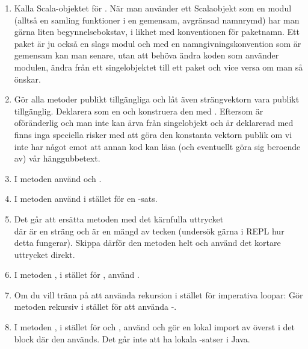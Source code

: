 \begin{enumerate}

\item Kalla Scala-objektet för . När man använder ett Scalaobjekt som en modul (alltså en samling funktioner i en gemensam, avgränsad namnrymd) har man gärna liten begynnelsebokstav, i likhet med konventionen för paketnamn. Ett paket är ju också en slags modul och med en namngivningskonvention som är gemensam kan man senare, utan att behöva ändra koden som använder modulen, ändra från ett singelobjektet till ett paket och vice versa om man så önskar.

\item Gör alla metoder publikt tillgängliga och låt även strängvektorn  vara publikt tillgänglig. Deklarera  som en  och konstruera den med . Eftersom  är oföränderlig och man inte kan ärva från singelobjekt och  är deklarerad med  finns inga speciella risker med att göra den konstanta vektorn publik om  vi inte har något emot att annan kod kan läsa (och eventuellt göra sig beroende av) vår hänggubbetext.

\item I metoden  använd  och .

\item I metoden  använd  i stället för en -sats.

\item Det går att ersätta metoden  med det kärnfulla uttrycket \\  där  är en sträng och  är en mängd av tecken (undersök gärna i REPL hur detta fungerar). Skippa därför den metoden helt och använd det kortare uttrycket direkt.

\item I metoden , i stället för , använd . 

\item Om du vill träna på att använda rekursion i stället för imperativa loopar: Gör metoden  rekursiv i stället för att använda -.

\item I metoden , i stället för  och , använd  och gör en lokal import av  överst i det block där den används. Det går inte att ha lokala -satser i Java.


\end{enumerate}
